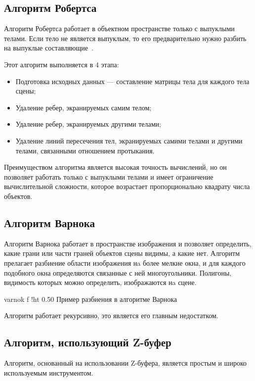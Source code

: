 \subsection{Алгоритм Робертса}

Алгоритм Робертса работает в объектном пространстве только с выпуклыми телами. 
Если тело не является выпуклым, то его предварительно нужно разбить на выпуклые составляющие~\cite{ROB}.

Этот алгоритм выполняется в 4 этапа:
\begin{itemize}[label*=---]
    \item Подготовка исходных данных --- составление матрицы тела для каждого тела сцены;
    \item Удаление ребер, экранируемых самим телом;
    \item Удаление ребер, экранируемых другими телами; 
    \item Удаление линий пересечения тел, экранируемых самими телами и другими телами, связанными отношением протыкания.
\end{itemize}

Преимуществом алгоритма является высокая точность вычислений, но он позволяет работать только с выпуклыми телами и имеет ограничение вычислительной сложности, которое возрастает пропорционально квадрату числа объектов.

\subsection{Алгоритм Варнока}

Алгоритм Варнока работает в пространстве изображения и позволяет определить, какие грани или части граней объектов сцены видимы, а какие нет. 
Алгоритм прелагает разбиение области изображения нa более мелкие окна, и для каждого подобного окна определяются связанные с ней многоугольники.
Полигоны, видимость которых можно определить, изображаются нa сцене.

    {varnok}
    {f}
    {!ht}
    {0.50\textwidth}
    {Пример разбиения в алгоритме Варнока}


Алгоритм работает рекурсивно, это является его главным недостатком.


\subsection{Алгоритм, использующий Z-буфер}

Алгоритм, основанный на использовании Z-буфера, является простым и широко используемым инструментом. 

